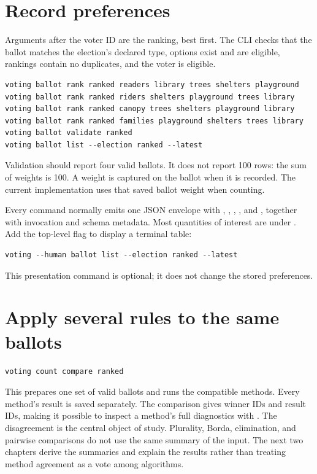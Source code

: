 \section{Record preferences}
Arguments after the voter ID are the ranking, best first. The CLI checks that the ballot matches the election's declared type, options exist and are eligible, rankings contain no duplicates, and the voter is eligible.
\begin{lstlisting}[style=votingrun]
voting ballot rank ranked readers library trees shelters playground
voting ballot rank ranked riders shelters playground trees library
voting ballot rank ranked canopy trees shelters playground library
voting ballot rank ranked families playground shelters trees library
voting ballot validate ranked
voting ballot list --election ranked --latest
\end{lstlisting}
Validation should report four valid ballots. It does not report 100 rows: the sum of weights is 100. A weight is captured on the ballot when it is recorded. The current implementation uses that saved ballot weight when counting.

Every command normally emits one JSON envelope with , , , , and , together with invocation and schema metadata. Most quantities of interest are under . Add the top-level flag  to display a terminal table:
\begin{lstlisting}
voting --human ballot list --election ranked --latest
\end{lstlisting}
This presentation command is optional; it does not change the stored preferences.

\section{Apply several rules to the same ballots}
\begin{lstlisting}[style=votingrun]
voting count compare ranked
\end{lstlisting}
This prepares one set of valid ballots and runs the compatible methods. Every method's result is saved separately. The comparison gives winner IDs and result IDs, making it possible to inspect a method's full diagnostics with .
The disagreement is the central object of study. Plurality, Borda, elimination, and pairwise comparisons do not use the same summary of the input. The next two chapters derive the summaries and explain the results rather than treating method agreement as a vote among algorithms.

